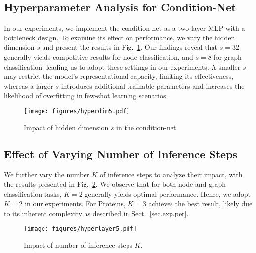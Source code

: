 \subsection{Hyperparameter Analysis for Condition-Net}
In our experiments, we implement the condition-net as a two-layer MLP with a bottleneck design. To examine its effect on performance, we vary the hidden dimension \( s \) and present the results in Fig.~\ref{fig.hiddendim}. Our findings reveal that \( s = 32 \) generally yields competitive results for node classification, and \( s = 8 \) for graph classification, leading us to adopt these settings in our experiments. A smaller \( s \) may restrict the model's representational capacity, limiting its effectiveness, whereas a larger \( s \) introduces additional trainable parameters and increases the likelihood of overfitting in few-shot learning scenarios.


\begin{figure}[t]
\centering
\texttt{[image: figures/hyperdim5.pdf]}
\caption{Impact of hidden dimension $s$ in the condition-net.}
\label{fig.hiddendim}
\end{figure}

\subsection{Effect of Varying Number of Inference Steps}
We further vary the number \(K\) of inference steps to analyze their impact, with the results presented in Fig.~\ref{fig.think}. We observe that for both node and graph classification tasks, \(K=2\) generally yields optimal performance. Hence, we adopt \(K=2\) in our experiments. For Proteins, \(K=3\) achieves the best result, likely due to its inherent complexity as described in Sect.~\ref{sec.exp.per}.

\begin{figure}[t]
\centering
\texttt{[image: figures/hyperlayer5.pdf]}
\caption{Impact of number of inference steps $K$.}
\label{fig.think}
\end{figure}

